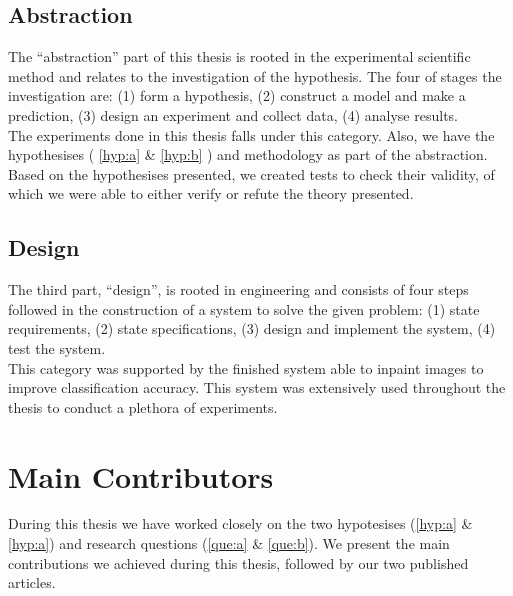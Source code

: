 \subsection{Abstraction}
The ``abstraction'' part of this thesis is rooted in the experimental scientific method and relates to the investigation of the hypothesis. The four of stages the investigation are: (1) form a hypothesis, (2) construct a model and make a prediction, (3) design an experiment and collect data, (4) analyse results. \\

The experiments done in this thesis falls under this category. Also, we have the hypothesises ( \ref{hyp:a} \& \ref{hyp:b} ) and methodology as part of the abstraction. Based on the hypothesises presented, we created tests to check their validity, of which we were able to either verify or refute the theory presented.



\subsection{Design}
The third part, ``design'', is rooted in engineering
and consists of four steps followed in the construction
of a system to solve the given problem: (1) state requirements, (2) state specifications, (3) design and implement the system, (4) test the system. \\

This category was supported by the finished system able to inpaint images to improve classification accuracy. This system was extensively used throughout the thesis to conduct a plethora of experiments.



\section{Main Contributors}
During this thesis we have worked closely on the two hypotesises (\ref{hyp:a} \& \ref{hyp:a}) and research questions (\ref{que:a} \& \ref{que:b}). 
We present the main contributions we achieved during this thesis, followed by our two published articles. 

